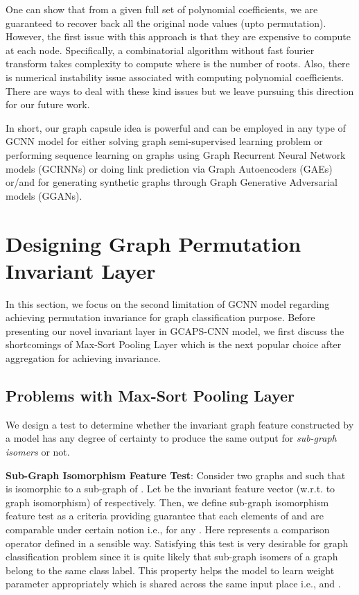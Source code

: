 \documentclass{article}
\begin{document}
\vspace{-0.5em}

\vspace{-0.5em}

One can show that from a given full set of  polynomial coefficients, we are guaranteed to recover back all the original node values (upto permutation). However, the first issue with   this approach is that they are   expensive to compute at each node. Specifically,  a combinatorial algorithm without fast fourier transform takes   complexity to compute where  is the number of roots. Also, there is numerical instability issue associated with computing   polynomial coefficients. There are   ways to deal with    these kind issues but we leave pursuing this direction   for our future work. 

In short, our graph capsule idea is powerful  and can be employed in any type of GCNN model for either solving graph semi-supervised learning problem or performing sequence learning on graphs using Graph Recurrent Neural Network models (GCRNNs) or doing link prediction via Graph Autoencoders (GAEs) or/and for generating synthetic graphs through Graph Generative Adversarial models (GGANs).



\section{Designing Graph Permutation Invariant Layer}\label{sec:permutation_inv}

In this section, we focus on the second limitation of GCNN model regarding achieving permutation invariance for graph classification purpose. Before presenting  our novel invariant layer in   GCAPS-CNN model, we first discuss the shortcomings of Max-Sort Pooling Layer which is the next popular choice after aggregation for achieving invariance.

\subsection{Problems with Max-Sort Pooling Layer}\label{sec:max-issue}

We design a test to determine whether the invariant graph feature constructed by a model has any degree of certainty  to produce the same output for \emph{sub-graph isomers} or not. 

\noindent \textbf{Sub-Graph Isomorphism Feature Test}: Consider two graphs  and  such that  is isomorphic to a sub-graph of . Let    be the invariant feature vector (w.r.t. to graph isomorphism) of  respectively. Then, we define sub-graph isomorphism feature test as a criteria providing guarantee that each elements of  and  are comparable under certain notion i.e.,  for any . Here    represents a comparison operator defined in a sensible way. Satisfying this test is  very desirable for graph classification problem since it is quite likely that sub-graph isomers of a graph belong to the same class label. This property helps the model to  learn   weight parameter appropriately which is shared     across the  same input place i.e.,  and  .
\end{document}
